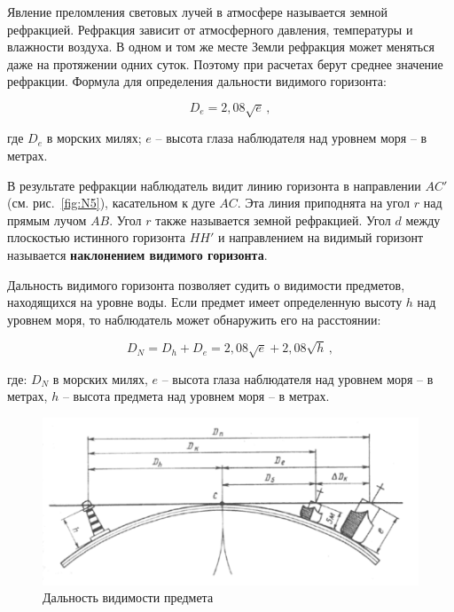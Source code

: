 \documentclass[a4paper, 12pt, twoside, final, book, russian, fittopage, cyremdash]{ncc}
\newcommand{\ris}[1]{\ref{fig:#1}}
\begin{document}
Явление преломления световых лучей в атмосфере называется земной рефракцией. Рефракция зависит от атмосферного давления, температуры и влажности воздуха. В одном и том же месте Земли рефракция может меняться даже на протяжении одних суток. Поэтому при расчетах берут среднее значение рефракции. Формула для определения дальности видимого горизонта:

\begin{equation}
  D_e = 2,08 \sqrt{e} \, ,
\end{equation}

где $D_e$ в морских милях; $e$ \--- высота глаза наблюдателя над уровнем моря \--- в метрах.

В результате рефракции наблюдатель видит линию горизонта в направлении $AC'$ (см. рис.~\ris{N5}), касательном к дуге $AC$. Эта линия приподнята на угол $r$ над прямым лучом $AB$. Угол $r$ также называется земной рефракцией. Угол $d$ между плоскостью истинного горизонта $HH'$ и направлением на видимый горизонт называется \textbf{наклонением видимого горизонта}.  

Дальность видимого горизонта позволяет судить о видимости предметов, находящихся на уровне воды. Если предмет имеет определенную высоту $h$ над уровнем моря, то наблюдатель может обнаружить его на расстоянии: 

\begin{equation}
  D_N = D_h + D_e = 2,08 \sqrt{e} + 2,08 \sqrt{h} \, , 
\end{equation}

где: $D_N$ в морских милях, $e$ \--- высота глаза наблюдателя над уровнем моря \--- в метрах, $h$ \--- высота предмета над уровнем моря \--- в метрах. 

\begin{figure}[htb]
  \centering{}
  \includegraphics{N006}
  \caption{Дальность видимости предмета}
  \label{fig:N6}
\end{figure}
\end{document}
